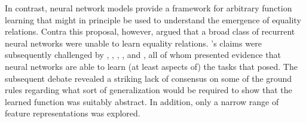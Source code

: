 \documentclass[9pt,twocolumn,twoside,lineno]{pnas-new}
\newcommand{\secref}[1]{Section~\ref{#1}}
\newcommand{\appref}[1]{Appendix~\ref{#1}}
\newcommand{\updatea}[1]{{\color{darkred}#1}}
\begin{document}
In contrast, neural network models provide a framework for arbitrary function learning that might in principle be used to understand the emergence of equality relations. Contra this proposal, however, \citet{marcus:1999} argued that a broad class of recurrent neural networks were unable to learn equality relations. \citeauthor{marcus:1999}'s claims were subsequently challenged by \citet{dienes:1999}, \citet{seidenberg:1999a}, \citet{seidenberg:1999b}, \citet{elman:1999}, and \citet{negishi:1999}, all of whom presented evidence that neural networks are able to learn (at least aspects of) the tasks that \citeauthor{marcus:1999} posed. \updatea{The subsequent debate \citep[reviewed in][]{alhama:2019} revealed a striking lack of consensus on some of the ground rules regarding what sort of generalization would be required to show that the learned function was suitably abstract. In addition, only a narrow range of feature representations was explored.}





\end{document}
